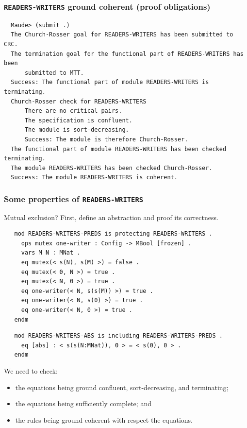 \documentclass[xcolor=dvipsnames,10pt]{beamer}
\begin{document}
\begin{frame}[fragile]
  \frametitle{\verb~READERS-WRITERS~ ground coherent (proof obligations)}

\begin{scriptsize}
\begin{verbatim}
  Maude> (submit .)
  The Church-Rosser goal for READERS-WRITERS has been submitted to CRC.
  The termination goal for the functional part of READERS-WRITERS has been
      submitted to MTT.
  Success: The functional part of module READERS-WRITERS is terminating.
  Church-Rosser check for READERS-WRITERS
      There are no critical pairs.
      The specification is confluent.
      The module is sort-decreasing.
      Success: The module is therefore Church-Rosser.
  The functional part of module READERS-WRITERS has been checked terminating.
  The module READERS-WRITERS has been checked Church-Rosser.
  Success: The module READERS-WRITERS is coherent.
\end{verbatim}
\end{scriptsize}

\end{frame}
\begin{frame}[fragile]
  \frametitle{Some properties of \verb~READERS-WRITERS~}

Mutual exclusion?
First, define an abstraction  and proof its correctness. 

\begin{scriptsize}
\begin{verbatim}
   mod READERS-WRITERS-PREDS is protecting READERS-WRITERS .
     ops mutex one-writer : Config -> MBool [frozen] .
     vars M N : MNat .
     eq mutex(< s(N), s(M) >) = false .
     eq mutex(< 0, N >) = true .
     eq mutex(< N, 0 >) = true .
     eq one-writer(< N, s(s(M)) >) = true .
     eq one-writer(< N, s(0) >) = true .
     eq one-writer(< N, 0 >) = true .
   endm 
\end{verbatim}
\end{scriptsize}
%
\begin{scriptsize}
\begin{verbatim}
   mod READERS-WRITERS-ABS is including READERS-WRITERS-PREDS .
     eq [abs] : < s(s(N:MNat)), 0 > = < s(0), 0 > .
   endm
\end{verbatim}
\end{scriptsize}
%
We need to check:
\begin{itemize}
\item the equations being ground confluent, sort-decreasing, and terminating;
\item the equations being sufficiently complete; and
\item the rules being ground coherent with respect the equations.
\end{itemize}

\end{frame}
\end{document}
